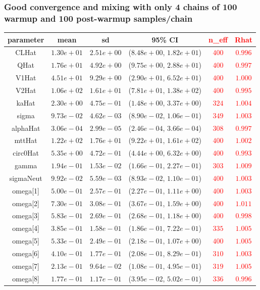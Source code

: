 \documentclass{beamer}
\begin{document}
\begin{frame}
  \frametitle{Good convergence and mixing with only 4 chains of 100 warmup and 100
    post-warmup samples/chain}
  
{\scriptsize
\begin{tabular}{cccccc}
\hline\hline
parameter&mean&sd&95\% CI&\textcolor{red}{n\_eff}&\textcolor{red}{Rhat}\tabularnewline
\hline
CLHat&$1.30e+01$&$2.51e+00$&($8.48e+00$, $1.82e+01$)&\textcolor{red}{$400$}&\textcolor{red}{$0.996$}\tabularnewline
QHat&$1.76e+01$&$4.92e+00$&($9.75e+00$, $2.88e+01$)&\textcolor{red}{$400$}&\textcolor{red}{$0.997$}\tabularnewline
V1Hat&$4.51e+01$&$9.29e+00$&($2.90e+01$, $6.52e+01$)&\textcolor{red}{$400$}&\textcolor{red}{$1.000$}\tabularnewline
V2Hat&$1.06e+02$&$1.61e+01$&($7.81e+01$, $1.38e+02$)&\textcolor{red}{$400$}&\textcolor{red}{$0.995$}\tabularnewline
kaHat&$2.30e+00$&$4.75e-01$&($1.48e+00$, $3.37e+00$)&\textcolor{red}{$324$}&\textcolor{red}{$1.004$}\tabularnewline
sigma&$9.73e-02$&$4.62e-03$&($8.90e-02$, $1.06e-01$)&\textcolor{red}{$349$}&\textcolor{red}{$1.003$}\tabularnewline
alphaHat&$3.06e-04$&$2.99e-05$&($2.46e-04$, $3.66e-04$)&\textcolor{red}{$308$}&\textcolor{red}{$0.997$}\tabularnewline
mttHat&$1.22e+02$&$1.76e+01$&($9.22e+01$, $1.61e+02$)&\textcolor{red}{$400$}&\textcolor{red}{$1.002$}\tabularnewline
circ0Hat&$5.35e+00$&$4.72e-01$&($4.44e+00$, $6.32e+00$)&\textcolor{red}{$400$}&\textcolor{red}{$0.993$}\tabularnewline
gamma&$1.94e-01$&$1.53e-02$&($1.66e-01$, $2.27e-01$)&\textcolor{red}{$303$}&\textcolor{red}{$1.009$}\tabularnewline
sigmaNeut&$9.92e-02$&$5.59e-03$&($8.93e-02$, $1.10e-01$)&\textcolor{red}{$400$}&\textcolor{red}{$1.003$}\tabularnewline
omega[1]&$5.00e-01$&$2.57e-01$&($2.27e-01$, $1.11e+00$)&\textcolor{red}{$400$}&\textcolor{red}{$1.003$}\tabularnewline
omega[2]&$7.30e-01$&$3.08e-01$&($3.67e-01$, $1.59e+00$)&\textcolor{red}{$400$}&\textcolor{red}{$1.011$}\tabularnewline
omega[3]&$5.83e-01$&$2.69e-01$&($2.68e-01$, $1.18e+00$)&\textcolor{red}{$400$}&\textcolor{red}{$0.998$}\tabularnewline
omega[4]&$3.85e-01$&$1.58e-01$&($1.86e-01$, $7.22e-01$)&\textcolor{red}{$335$}&\textcolor{red}{$1.005$}\tabularnewline
omega[5]&$5.33e-01$&$2.49e-01$&($2.18e-01$, $1.07e+00$)&\textcolor{red}{$400$}&\textcolor{red}{$1.005$}\tabularnewline
omega[6]&$4.10e-01$&$1.77e-01$&($2.08e-01$, $8.29e-01$)&\textcolor{red}{$310$}&\textcolor{red}{$1.003$}\tabularnewline
omega[7]&$2.13e-01$&$9.64e-02$&($1.08e-01$, $4.95e-01$)&\textcolor{red}{$319$}&\textcolor{red}{$1.005$}\tabularnewline
omega[8]&$1.77e-01$&$1.17e-01$&($3.95e-02$, $5.02e-01$)&\textcolor{red}{$336$}&\textcolor{red}{$0.996$}\tabularnewline
\hline
\end{tabular}}


\end{frame}
\end{document}
